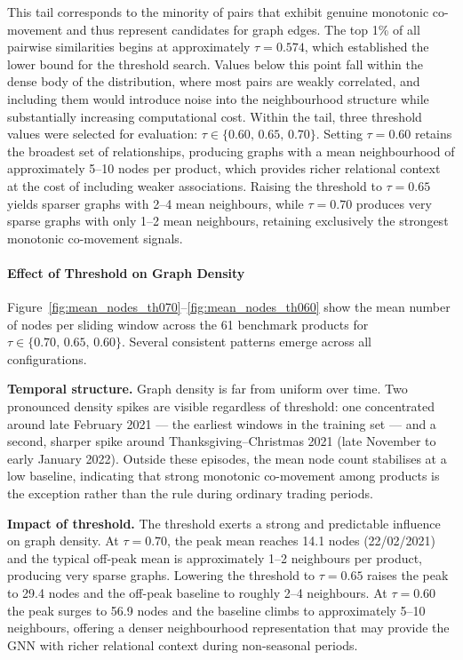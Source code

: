 This tail corresponds to the minority of pairs that exhibit genuine monotonic 
co-movement and thus represent candidates for graph edges. The top 1\% of all 
pairwise similarities begins at approximately $\tau = 0.574$, which established 
the lower bound for the threshold search. Values below this point fall within the 
dense body of the distribution, where most pairs are weakly correlated, and 
including them would introduce noise into the neighbourhood structure while 
substantially increasing computational cost. Within the tail, three threshold 
values were selected for evaluation: $\tau \in \{0.60,\, 0.65,\, 0.70\}$. 
Setting $\tau = 0.60$ retains the broadest set of relationships, producing 
graphs with a mean neighbourhood of approximately 5--10 nodes per product, 
which provides richer relational context at the cost of including weaker 
associations. Raising the threshold to $\tau = 0.65$ yields sparser graphs 
with 2--4 mean neighbours, while $\tau = 0.70$ produces very sparse graphs 
with only 1--2 mean neighbours, retaining exclusively the strongest monotonic 
co-movement signals.

\paragraph{Effect of Threshold on Graph Density}

Figure~\ref{fig:mean_nodes_th070}--\ref{fig:mean_nodes_th060} show the mean 
number of nodes per sliding window across the 61 benchmark products for 
$\tau \in \{0.70,\, 0.65,\, 0.60\}$. Several consistent patterns emerge 
across all configurations.

\textbf{Temporal structure.} Graph density is far from uniform over time. 
Two pronounced density spikes are visible regardless of threshold: one 
concentrated around late February 2021 — the earliest windows in the 
training set — and a second, sharper spike around Thanksgiving--Christmas 
2021 (late November to early January 2022). Outside these episodes, the 
mean node count stabilises at a low baseline, indicating that strong 
monotonic co-movement among products is the exception rather than the rule 
during ordinary trading periods.

\textbf{Impact of threshold.} The threshold exerts a strong and predictable 
influence on graph density. At $\tau = 0.70$, the peak mean reaches 14.1 
nodes (22/02/2021) and the typical off-peak mean is approximately 1--2 
neighbours per product, producing very sparse graphs. Lowering the threshold 
to $\tau = 0.65$ raises the peak to 29.4 nodes and the off-peak baseline 
to roughly 2--4 neighbours. At $\tau = 0.60$ the peak surges to 56.9 nodes 
and the baseline climbs to approximately 5--10 neighbours, offering a denser 
neighbourhood representation that may provide the GNN with richer relational 
context during non-seasonal periods.

